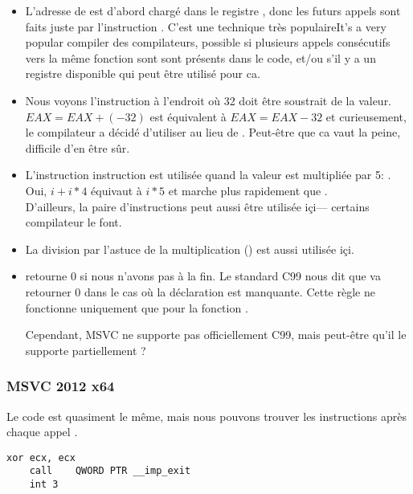 \begin{itemize}
\item L'adresse de \printf est d'abord chargé dans le
registre \ESI, donc les futurs
appels \printf sont faits juste par l'instruction .
C'est une technique très populaireIt's a very popular compiler 
des compilateurs, possible si plusieurs appels consécutifs vers la même fonction sont sont présents
dans le code, et/ou s'il y a un registre disponible qui peut être utilisé pour ca.

\item Nous voyons l'instruction  
à l'endroit où 32 doit être soustrait de la valeur.
$EAX=EAX+(-32)$ est équivalent à $EAX=EAX-32$ 
et curieusement, le compilateur a décidé d'utiliser  au lieu de .
Peut-être que ca vaut la peine, difficile d'en être sûr.

\item L'instruction \LEA instruction est utilisée quand 
la valeur est multipliée par 5: .
Oui, $i+i*4$ équivaut à $i*5$ et \LEA 
marche plus rapidement que .\\
D'ailleurs, la paire d'instructions  peut aussi être utilisée içi---
certains compilateur le font.

\item La division par l'astuce de la multiplication () 
est aussi utilisée içi.

\item \main retourne 0 si nous n'avons pas  
à la fin.
Le standard C99 nous dit  que \main 
va retourner 0 dans le cas où 
la déclaration  est manquante.
Cette règle ne fonctionne uniquement que pour la fonction \main.

Cependant, MSVC ne supporte pas officiellement C99, mais peut-être qu'il le supporte partiellement ?
\end{itemize}

\subsubsection{\Optimizing MSVC 2012 x64}

Le code est quasiment le même, mais nous pouvons trouver les instructions  après chaque appel .

\begin{lstlisting}[style=customasm]
	xor	ecx, ecx
	call	QWORD PTR __imp_exit
	int	3
\end{lstlisting}

